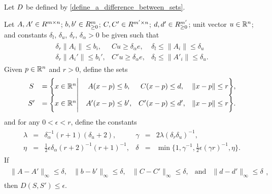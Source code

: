 \begin{lemma}
\label{the_lemma_to_end_all_lemmas}
Let ${D}$ be defined by \cref{define_a_difference_between_sets}.

Let
$A, A' \in \mathbb \mathbb R^{m \times n}$;
$b, b' \in \mathbb \mathbb R^{m}_{\ge 0}$;
$C, C' \in \mathbb \mathbb R^{m' \times n}$;
$d, d' \in \mathbb \mathbb R^{m'}_{\ge 0}$;
unit vector $u \in \mathbb R^n$;
and constants
$\delta_l$,
$\delta_u$,
$\delta_r$,
$\delta_{\alpha} > 0$
be given such that
\begin{align*}
\begin{array}{cccc}
\delta_r \|A_i\| \le b_i,			&
Cu \ge \delta_{\alpha} e,			&
\delta_l \le \|A_i\| \le \delta_u	\\
\delta_r \|A_i'\| \le b_i',			&
C'u \ge \delta_{\alpha} e, 			&
\delta_l \le \|A'_i\| \le \delta_u.
\end{array}
\end{align*}
Given $p \in \mathbb R^n$ and $r > 0$, define the sets
\begin{align*}
\begin{array}{ccccc}
S  &= \bigg\{x \in \mathbb R^n \bigg|& A (x - p) \le b ,& C (x - p) \le d ,& \|x - p\| \le r \bigg\}, \\
S' &= \bigg\{x \in \mathbb R^n \bigg|& A'(x - p) \le b',& C'(x - p) \le d',& \|x - p\| \le r \bigg\}.
\end{array}
\end{align*}
and for any $0 < \epsilon < r$, define the constants
\begin{align*}
\begin{array}{cccccc}
\lambda &=& \delta_{\alpha}^{-1}(r + 1) (\delta_u + 2), &
\gamma &=& 2\lambda(\delta_r \delta_u)^{-1}, \\
\eta    &=& \frac 1 2 \epsilon\delta_{\alpha}(r+2)^{-1}(r + 1)^{-1}, &
\delta &=& \min\bigg\{
1,
\gamma^{-1},
\frac 1 2 {\epsilon} (\gamma r)^{-1},
\eta
\bigg\}.
\end{array}
\end{align*}
If
\begin{align*}
\begin{array}{ccccc}
\|A - A'\|_{\infty} \le \delta,	& \|b - b'\|_{\infty} \le \delta,		& \|C - C'\|_{\infty} \le \delta,	& \textrm{and} & \|d - d'\|_{\infty} \le \delta
\end{array},
\end{align*}
then
$D(S, S') \le \epsilon$.





\end{lemma}
